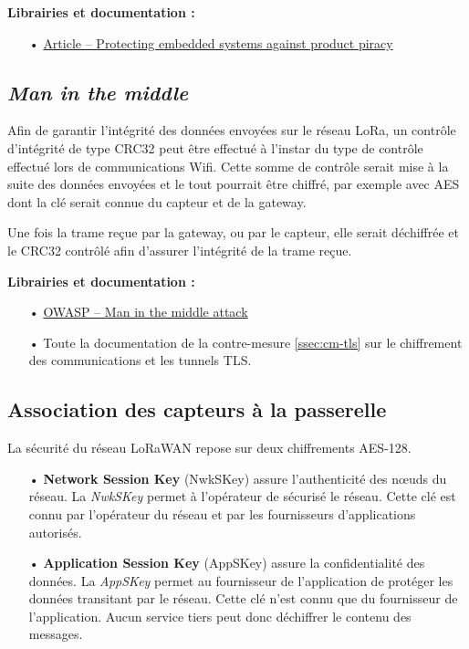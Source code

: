 \documentclass[12pt]{article}
\begin{document}
\medskip
\textbf{Librairies et documentation :}

\begin{itemize}
\item[•] \href{https://www.aisec.fraunhofer.de/content/dam/aisec/Dokumente/Publikationen/Studien_TechReports/englisch/Whitepaper_ProductProtection.pdf}{Article -- Protecting embedded systems against product piracy}
\end{itemize}

\subsection{\emph{Man in the middle}}
\label{ssec:cm-mitm}

Afin de garantir l'intégrité des données envoyées sur le réseau LoRa, un contrôle d'intégrité de type CRC32 peut être effectué à l'instar du type de contrôle effectué lors de communications Wifi. Cette somme de contrôle serait mise à la suite des données envoyées et le tout pourrait être chiffré, par exemple avec AES dont la clé serait connue du capteur et de la gateway.

Une fois la trame reçue par la gateway, ou par le capteur, elle serait déchiffrée et le CRC32 contrôlé afin d'assurer l'intégrité de la trame reçue.

\medskip
\textbf{Librairies et documentation :}

\begin{itemize}
\item[•] \href{https://www.owasp.org/index.php/Man-in-the-middle_attack}{OWASP -- Man in the middle attack}
\item[•] Toute la documentation de la contre-mesure \ref{ssec:cm-tls} sur le chiffrement des communications et les tunnels TLS.
\end{itemize}

\subsection{Association des capteurs à la passerelle}
\label{ssec:cm-association}

La sécurité du réseau LoRaWAN repose sur deux chiffrements AES-128.

\begin{itemize}
\item[•] \textbf{Network Session Key} (NwkSKey) assure l'authenticité des nœuds du réseau. La \emph{NwkSKey} permet à l'opérateur de sécurisé le réseau. Cette clé est connu par l'opérateur du réseau et par les fournisseurs d'applications autorisés.
\item[•] \textbf{Application Session Key} (AppSKey) assure la confidentialité des données. La \emph{AppSKey} permet au fournisseur de l'application de protéger les données transitant par le réseau. Cette clé n'est connu que du fournisseur de l'application. Aucun service tiers peut donc déchiffrer le contenu des messages.
\end{itemize}
\end{document}

